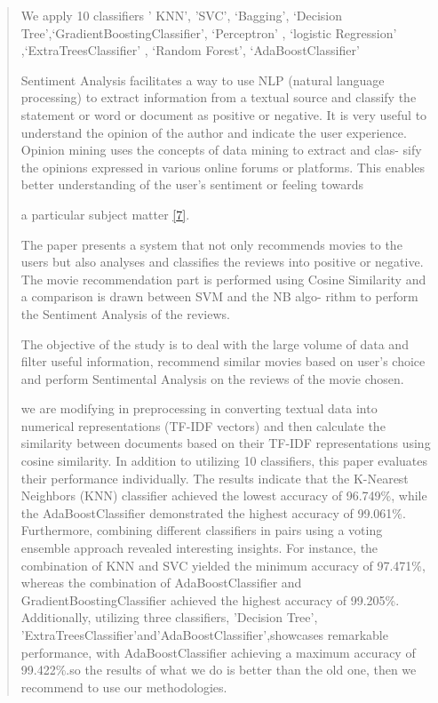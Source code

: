 \documentclass[
]{article}
\begin{document}
\begin{quote}
We apply 10 classifiers ' KNN', 'SVC', `Bagging', `Decision
Tree',`GradientBoostingClassifier', `Perceptron' , `logistic Regression'
,`ExtraTreesClassifier' , `Random Forest', `AdaBoostClassifier'

Sentiment Analysis facilitates a way to use NLP (natural language
processing) to extract information from a textual source and classify
the statement or word or document as positive or negative. It is very
useful to understand the opinion of the author and indicate the user
experience. Opinion mining uses the concepts of data mining to extract
and clas- sify the opinions expressed in various online forums or
platforms. This enables better understanding of the user's sentiment or
feeling towards

a particular subject matter \protect\hyperlink{_bookmark27}{{[}7{]}}.

The paper presents a system that not only recommends movies to the users
but also analyses and classiﬁes the reviews into positive or negative.
The movie recommendation part is performed using Cosine Similarity and a
comparison is drawn between SVM and the NB algo- rithm to perform the
Sentiment Analysis of the reviews.

The objective of the study is to deal with the large volume of data and
ﬁlter useful information, recommend similar movies based on user's
choice and perform Sentimental Analysis on the reviews of the movie
chosen.

we are modifying in preprocessing in converting textual data into
numerical representations (TF-IDF vectors) and then calculate the
similarity between documents based on their TF-IDF representations using
cosine similarity. In addition to utilizing 10 classifiers, this paper
evaluates their performance individually. The results indicate that the
K-Nearest Neighbors (KNN) classifier achieved the lowest accuracy of
96.749\%, while the AdaBoostClassifier demonstrated the highest accuracy
of 99.061\%. Furthermore, combining different classifiers in pairs using
a voting ensemble approach revealed interesting insights. For instance,
the combination of KNN and SVC yielded the minimum accuracy of 97.471\%,
whereas the combination of AdaBoostClassifier and
GradientBoostingClassifier achieved the highest accuracy of 99.205\%.
Additionally, utilizing three classifiers, 'Decision Tree',
'ExtraTreesClassifier'and'AdaBoostClassifier',showcases remarkable
performance, with AdaBoostClassifier achieving a maximum accuracy of
99.422\%.so the results of what we do is better than the old one, then
we recommend to use our methodologies.


\end{quote}
\end{document}
